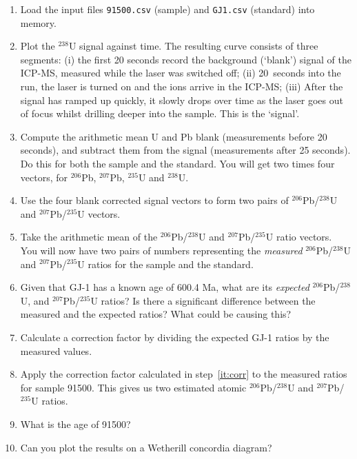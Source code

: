 \begin{enumerate}
\item Load the input files {\tt 91500.csv} (sample) and {\tt GJ1.csv}
  (standard) into memory.
\item Plot the $^{238}$U signal against time. The resulting curve
  consists of three segments: (i) the first 20 seconds record the
  background (`blank') signal of the ICP-MS, measured while the laser
  was switched off; (ii) 20~seconds into the run, the laser is turned
  on and the ions arrive in the ICP-MS; (iii) After the signal has
  ramped up quickly, it slowly drops over time as the laser goes out
  of focus whilst drilling deeper into the sample. This is the
  `signal'.
\item Compute the arithmetic mean U and Pb blank (measurements before
  20 seconds), and subtract them from the signal (measurements after
  25 seconds). Do this for both the sample and the standard.  You will
  get two times four vectors, for $^{206}$Pb, $^{207}$Pb, $^{235}$U
  and $^{238}$U.
\item Use the four blank corrected signal vectors to form two pairs of
  $^{206}$Pb/$^{238}$U and $^{207}$Pb/$^{235}$U vectors.
\item Take the arithmetic mean of the $^{206}$Pb/$^{238}$U and
  $^{207}$Pb/$^{235}$U ratio vectors. You will now have two pairs of
  numbers representing the \emph{measured} $^{206}$Pb/$^{238}$U and
  $^{207}$Pb/$^{235}$U ratios for the sample and the standard.
\item Given that GJ-1 has a known age of 600.4 Ma, what are its
  \emph{expected} $^{206}$Pb/$^{238}$U, and $^{207}$Pb/$^{235}$U
  ratios? Is there a significant difference between the measured and
  the expected ratios? What could be causing this?
\item\label{it:corr} Calculate a correction factor by dividing the
  expected GJ-1 ratios by the measured values.
\item\label{it:atomicUPb} Apply the correction factor calculated in
  step~\ref{it:corr} to the measured ratios for sample 91500. This
  gives us two estimated atomic $^{206}$Pb/$^{238}$U and
  $^{207}$Pb/$^{235}$U ratios.
\item What is the age of 91500?
\item Can you plot the results on a Wetherill concordia diagram?
\end{enumerate}
